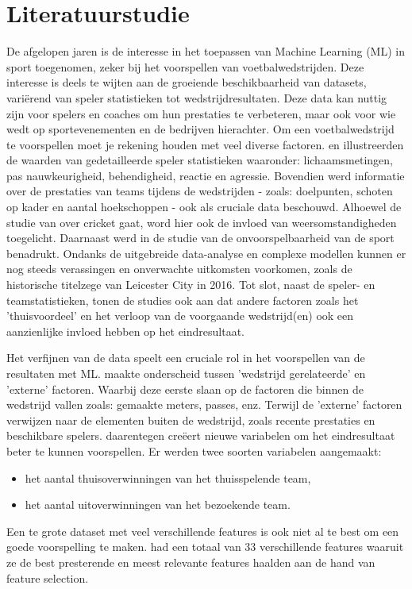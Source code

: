 
\section{Literatuurstudie}%
\label{sec:state-of-the-art}

De afgelopen jaren is de interesse in het toepassen van Machine Learning (ML) in sport toegenomen, zeker bij het voorspellen van voetbalwedstrijden. Deze interesse is deels te wijten aan de groeiende beschikbaarheid van datasets, variërend van speler statistieken tot wedstrijdresultaten. Deze data kan nuttig zijn voor spelers en coaches om hun prestaties te verbeteren, maar ook voor wie wedt op sportevenementen en de bedrijven hierachter.
Om een voetbalwedstrijd te voorspellen moet je rekening houden met veel diverse factoren. \textcite{Stuebinger2019} en \textcite{Rodrigues2022} illustreerden de waarden van gedetailleerde speler statistieken waaronder: lichaamsmetingen, pas nauwkeurigheid, behendigheid, reactie en agressie. Bovendien werd informatie over de prestaties van teams tijdens de wedstrijden - zoals: doelpunten, schoten op kader en aantal hoekschoppen - ook als cruciale data beschouwd. Alhoewel de studie van \textcite{Sathyanarayana2022} over cricket gaat, word hier ook de invloed van weersomstandigheden toegelicht.
Daarnaast werd in de studie van \textcite{Baboota2019} de onvoorspelbaarheid van de sport benadrukt. Ondanks de uitgebreide data-analyse en complexe modellen kunnen er nog steeds verassingen en onverwachte uitkomsten voorkomen, zoals de historische titelzege van Leicester City in 2016.
Tot slot, naast de speler- en teamstatistieken, tonen de studies ook aan dat andere factoren zoals het 'thuisvoordeel' en het verloop van de voorgaande wedstrijd(en) ook een aanzienlijke invloed hebben op het eindresultaat.

Het verfijnen van de data speelt een cruciale rol in het voorspellen van de resultaten met ML. \textcite{Bunker2019} maakte onderscheid tussen 'wedstrijd gerelateerde' en 'externe' factoren. Waarbij deze eerste slaan op de factoren die binnen de wedstrijd vallen zoals: gemaakte meters, passes, enz. Terwijl de 'externe' factoren verwijzen naar de elementen buiten de wedstrijd, zoals recente prestaties en beschikbare spelers.
\textcite{Rodrigues2022} daarentegen creëert nieuwe variabelen om het eindresultaat beter te kunnen voorspellen. Er werden twee soorten variabelen aangemaakt:
\begin{itemize}
  \item het aantal thuisoverwinningen van het thuisspelende team,
  \item het aantal uitoverwinningen van het bezoekende team.
\end{itemize}
Een te grote dataset met veel verschillende features is ook niet al te best om een goede voorspelling te maken. \textcite{Baboota2019} had een totaal van 33 verschillende features waaruit ze de best presterende en meest relevante features haalden aan de hand van feature selection.

